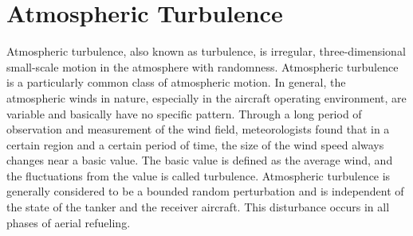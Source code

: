\section{Atmospheric Turbulence}
 Atmospheric turbulence, also known as turbulence, is irregular, three-dimensional small-scale motion in the atmosphere with randomness. Atmospheric turbulence is a particularly common class of atmospheric motion. In general, the atmospheric winds in nature, especially in the aircraft operating environment, are variable and basically have no specific pattern. Through a long period of observation and measurement of the wind field, meteorologists found that in a certain region and a certain period of time, the size of the wind speed always changes near a basic value. The basic value is defined as the average wind, and the fluctuations from the value is called turbulence. Atmospheric turbulence is generally considered to be a bounded random perturbation and is independent of the state of the tanker and the receiver aircraft. This disturbance occurs in all phases of aerial refueling.

